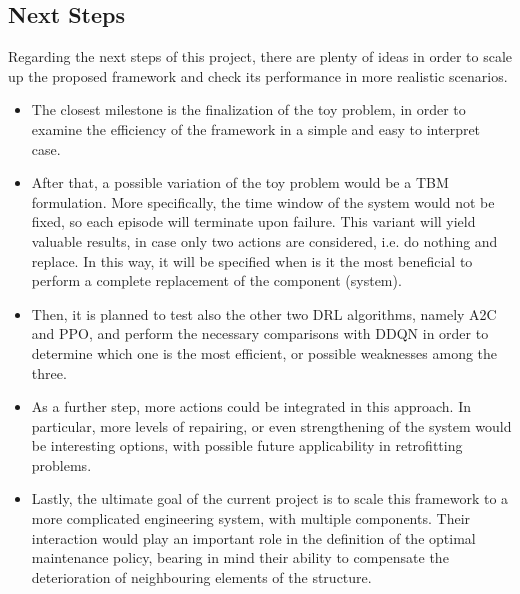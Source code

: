 \subsection{Next Steps}

Regarding the next steps of this project, there are plenty of ideas in order to scale up the proposed framework and check its performance in more realistic scenarios.

\begin{itemize}
    \item The closest milestone is the finalization of the toy problem, in order to examine the efficiency of the framework in a simple and easy to interpret case.
    \item After that, a possible variation of the toy problem would be a \gls{TBM} formulation. More specifically, the time window of the system would not be fixed, so each episode will terminate upon failure. This variant will yield valuable results, in case only two actions are considered, i.e. do nothing and replace. In this way, it will be specified when is it the most beneficial to perform a complete replacement of the component (system).
    \item Then, it is planned to test also the other two \gls{DRL} algorithms, namely \gls{A2C} and \gls{PPO}, and perform the necessary comparisons with \gls{DDQN} in order to determine which one is the most efficient, or possible weaknesses among the three.
    \item As a further step, more actions could be integrated in this approach. In particular, more levels of repairing, or even strengthening of the system would be interesting options, with possible future applicability in retrofitting problems.
    \item Lastly, the ultimate goal of the current project is to scale this framework to a more complicated engineering system, with multiple components. Their interaction would play an important role in the definition of the optimal maintenance policy, bearing in mind their ability to compensate the deterioration of neighbouring elements of the structure.
\end{itemize}